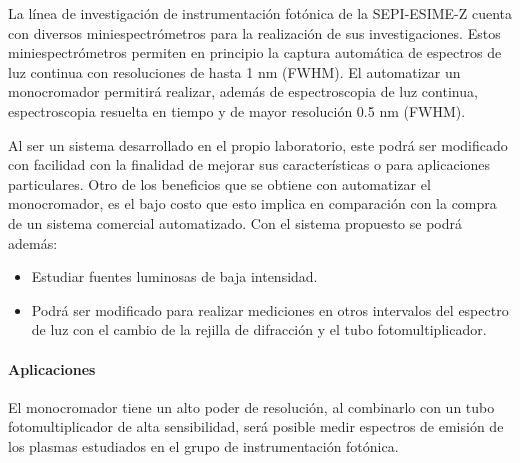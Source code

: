 La línea de investigación de instrumentación fotónica de la SEPI-ESIME-Z cuenta con diversos miniespectrómetros para la realización de sus investigaciones. Estos miniespectrómetros permiten en principio la captura automática de espectros de luz continua  con resoluciones de hasta 1 nm (FWHM). El automatizar un monocromador permitirá realizar, además de espectroscopia de luz continua, espectroscopia resuelta en tiempo y de mayor resolución 0.5 nm (FWHM).


Al ser un sistema desarrollado en el propio laboratorio, este podrá ser modificado con facilidad con la finalidad de mejorar sus características o para aplicaciones particulares. Otro de los beneficios que se obtiene con automatizar el monocromador, es el bajo costo que esto implica en comparación con la compra de un sistema comercial automatizado. Con el sistema propuesto se podrá además:
\begin{itemize}
\item Estudiar fuentes luminosas de baja intensidad.
\item Podrá ser modificado para realizar mediciones en otros intervalos del espectro de luz con el cambio de la rejilla de difracción y el tubo fotomultiplicador.
\end{itemize}

\paragraph{Aplicaciones} 
El monocromador tiene un alto poder de resolución, al combinarlo con un tubo fotomultiplicador de alta sensibilidad, será posible medir espectros de emisión de los plasmas estudiados en el grupo de instrumentación fotónica.
